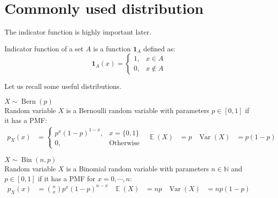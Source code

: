 \documentclass{huhtakm-template-book-v2}
\DeclareMathOperator{\E}{\mathbb{E}}
\DeclareMathOperator{\Var}{Var}
\DeclareMathOperator{\Bern}{Bern}
\DeclareMathOperator{\Bin}{Bin}
\begin{document}
\section{Commonly used distribution}
The indicator function is highly important later.
\begin{defn}
	Indicator function of a set $A$ is a function $\mathbf{1}_{A}$ defined as:
	\begin{equation*}
		\mathbf{1}_{A}(x)=\begin{cases}
			1, &x\in A\\
			0, &x\not\in A
		\end{cases}
	\end{equation*}
\end{defn}
Let us recall some useful distributions.
\begin{eg} $X\sim\Bern(p)$\\
	Random variable $X$ is a Bernoulli random variable with parameters $p\in[0,1]$ if it has a PMF:
	\begin{align*}
		p_{X}(x)&=\begin{cases}
			p^{x}(1-p)^{1-x}, &x=\{0,1\}\\
			0, &\text{Otherwise}
		\end{cases} & \E(X)&=p & \Var(X)&=p(1-p)
	\end{align*}
\end{eg}
\begin{eg} $X\sim\Bin(n,p)$\\
	Random variable $X$ is a Binomial random variable with parameters $n\in\mathbb{N}$ and $p\in[0,1]$ if it has a PMF for $x=0,\cdots,n$:
	\begin{align*}
		p_{X}(x)&=\binom{n}{x}p^{x}(1-p)^{n-x} & \E(X)&=np & \Var(X)&=np(1-p)
	\end{align*}
\end{eg}
\end{document}
